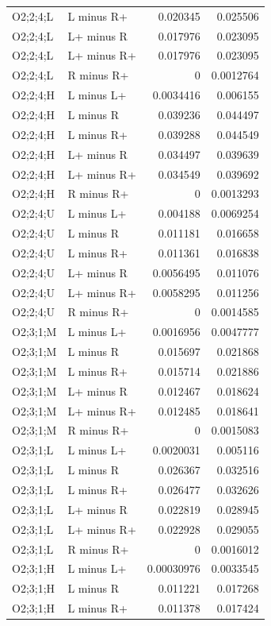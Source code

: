 {\begin{longtable}{@{}llrr@{}}
O2;2;4;L & L minus R+ & 0.020345 & 0.025506 \\
O2;2;4;L & L+ minus R & 0.017976 & 0.023095 \\
O2;2;4;L & L+ minus R+ & 0.017976 & 0.023095 \\
O2;2;4;L & R minus R+ & 0 & 0.0012764 \\
O2;2;4;H & L minus L+ & 0.0034416 & 0.006155 \\
O2;2;4;H & L minus R & 0.039236 & 0.044497 \\
O2;2;4;H & L minus R+ & 0.039288 & 0.044549 \\
O2;2;4;H & L+ minus R & 0.034497 & 0.039639 \\
O2;2;4;H & L+ minus R+ & 0.034549 & 0.039692 \\
O2;2;4;H & R minus R+ & 0 & 0.0013293 \\
O2;2;4;U & L minus L+ & 0.004188 & 0.0069254 \\
O2;2;4;U & L minus R & 0.011181 & 0.016658 \\
O2;2;4;U & L minus R+ & 0.011361 & 0.016838 \\
O2;2;4;U & L+ minus R & 0.0056495 & 0.011076 \\
O2;2;4;U & L+ minus R+ & 0.0058295 & 0.011256 \\
O2;2;4;U & R minus R+ & 0 & 0.0014585 \\
O2;3;1;M & L minus L+ & 0.0016956 & 0.0047777 \\
O2;3;1;M & L minus R & 0.015697 & 0.021868 \\
O2;3;1;M & L minus R+ & 0.015714 & 0.021886 \\
O2;3;1;M & L+ minus R & 0.012467 & 0.018624 \\
O2;3;1;M & L+ minus R+ & 0.012485 & 0.018641 \\
O2;3;1;M & R minus R+ & 0 & 0.0015083 \\
O2;3;1;L & L minus L+ & 0.0020031 & 0.005116 \\
O2;3;1;L & L minus R & 0.026367 & 0.032516 \\
O2;3;1;L & L minus R+ & 0.026477 & 0.032626 \\
O2;3;1;L & L+ minus R & 0.022819 & 0.028945 \\
O2;3;1;L & L+ minus R+ & 0.022928 & 0.029055 \\
O2;3;1;L & R minus R+ & 0 & 0.0016012 \\
O2;3;1;H & L minus L+ & 0.00030976 & 0.0033545 \\
O2;3;1;H & L minus R & 0.011221 & 0.017268 \\
O2;3;1;H & L minus R+ & 0.011378 & 0.017424 \\

\end{longtable}}
